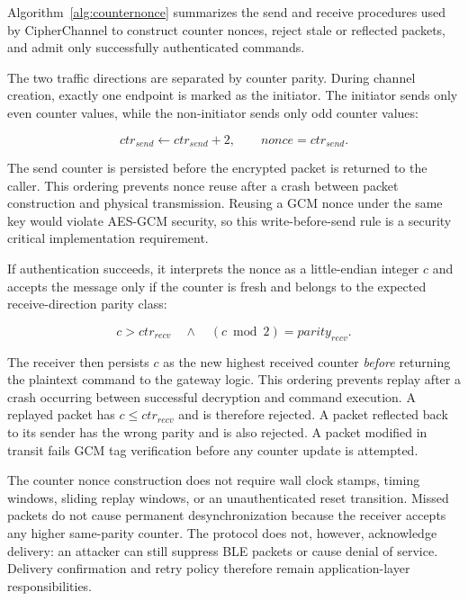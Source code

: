 \documentclass[journal]{IEEEtran}
\begin{document}
Algorithm~\ref{alg:counternonce} summarizes the send and receive procedures used by CipherChannel to construct counter nonces, reject stale or reflected packets, and admit only successfully authenticated commands.

The two traffic directions are separated by counter parity. During channel creation, exactly one endpoint is marked as the initiator. The initiator sends only even counter values, while the non-initiator sends only odd counter values:

\begin{equation}
\mathit{ctr}_{send} \leftarrow \mathit{ctr}_{send} + 2,
\qquad
\mathit{nonce} = \mathit{ctr}_{send}.
\label{eq:sendcounter}
\end{equation}

\noindent The send counter is persisted before the encrypted packet is returned to the caller. This ordering prevents nonce reuse after a crash between packet construction and physical transmission. Reusing a GCM nonce under the same key would violate AES-GCM security, so this write-before-send rule is a security critical implementation requirement.

If authentication succeeds, it interprets the nonce as a little-endian integer $c$ and accepts the message only if the counter is fresh and belongs to the expected receive-direction parity class:

\begin{equation}
c > \mathit{ctr}_{recv}
\quad\land\quad
(c \bmod 2) = \mathit{parity}_{recv}.
\label{eq:counteraccept}
\end{equation}

\noindent The receiver then persists $c$ as the new highest received counter \emph{before} returning the plaintext command to the gateway logic. This ordering prevents replay after a crash occurring between successful decryption and command execution. A replayed packet has $c \leq \mathit{ctr}_{recv}$ and is therefore rejected. A packet reflected back to its sender has the wrong parity and is also rejected. A packet modified in transit fails GCM tag verification before any counter update is attempted.

The counter nonce construction does not require wall clock stamps, timing windows, sliding replay windows, or an unauthenticated reset transition. Missed packets do not cause permanent desynchronization because the receiver accepts any higher same-parity counter. The protocol does not, however, acknowledge delivery: an attacker can still suppress BLE packets or cause denial of service. Delivery confirmation and retry policy therefore remain application-layer responsibilities.
\end{document}
